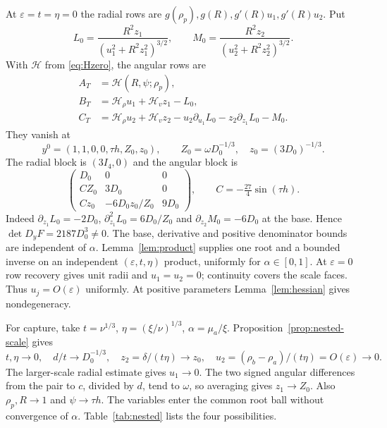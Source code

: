 \documentclass[11pt,a4paper]{article}
\numberwithin{equation}{section}
\theoremstyle{remark}
\newcommand{\eps}{\varepsilon}
\begin{document}
At $\eps=t=\eta=0$ the radial rows are $g(\rho_p),g(R),g'(R)u_1,g'(R)u_2$. Put
\[
 L_0=\frac{R^2z_1}{(u_1^2+R^2z_1^2)^{3/2}},\qquad
 M_0=\frac{R^2z_2}{(u_2^2+R^2z_2^2)^{3/2}}.
\]
With $\mathcal H$ from \eqref{eq:Hzero}, the angular rows are
\begin{equation}\label{eq:nest-boundary}
 \begin{aligned}
 A_T&=\mathcal H(R,\psi;\rho_p),\\
 B_T&=\mathcal H_\rho u_1+\mathcal H_vz_1-L_0,\\
 C_T&=\mathcal H_\rho u_2+\mathcal H_vz_2-u_2\partial_{u_1}L_0-z_2\partial_{z_1}L_0-M_0.
 \end{aligned}
\end{equation}
They vanish at
\begin{equation}\label{eq:nest-base}
 y^0=(1,1,0,0,\tau h,Z_0,z_0),\qquad
 Z_0=\omega D_0^{-1/3},\quad z_0=(3D_0)^{-1/3}.
\end{equation}
The radial block is $(3I_4,0)$ and the angular block is
\begin{equation}\label{eq:nest-angle-J}
 \begin{pmatrix}
 D_0&0&0\\
 CZ_0&3D_0&0\\
 Cz_0&-6D_0z_0/Z_0&9D_0
 \end{pmatrix},\qquad C=-\tfrac{27}{4}\sin(\tau h).
\end{equation}
Indeed $\partial_{z_1}L_0=-2D_0$, $\partial_{z_1}^2L_0=6D_0/Z_0$ and $\partial_{z_2}M_0=-6D_0$ at the base. Hence $\det D_yF=2187D_0^3\ne0$. The base, derivative and positive denominator bounds are independent of $\alpha$. Lemma~\ref{lem:product} supplies one root and a bounded inverse on an independent $(\eps,t,\eta)$ product, uniformly for $\alpha\in[0,1]$. At $\eps=0$ row recovery gives unit radii and $u_1=u_2=0$; continuity covers the scale faces. Thus $u_j=O(\eps)$ uniformly. At positive parameters Lemma~\ref{lem:hessian} gives nondegeneracy.

For capture, take $t=\nu^{1/3}$, $\eta=(\xi/\nu)^{1/3}$, $\alpha=\mu_a/\xi$. Proposition~\ref{prop:nested-scale} gives
\[
 t,\eta\to0,\quad d/t\to D_0^{-1/3},\quad
 z_2=\delta/(t\eta)\to z_0,\quad
 u_2=(\rho_b-\rho_a)/(t\eta)=O(\eps)\to0.
\]
The larger-scale radial estimate gives $u_1\to0$. The two signed angular differences from the pair to $c$, divided by $d$, tend to $\omega$, so averaging gives $z_1\to Z_0$. Also $\rho_p,R\to1$ and $\psi\to\tau h$. The variables enter the common root ball without convergence of $\alpha$. Table~\ref{tab:nested} lists the four possibilities.
\end{document}
